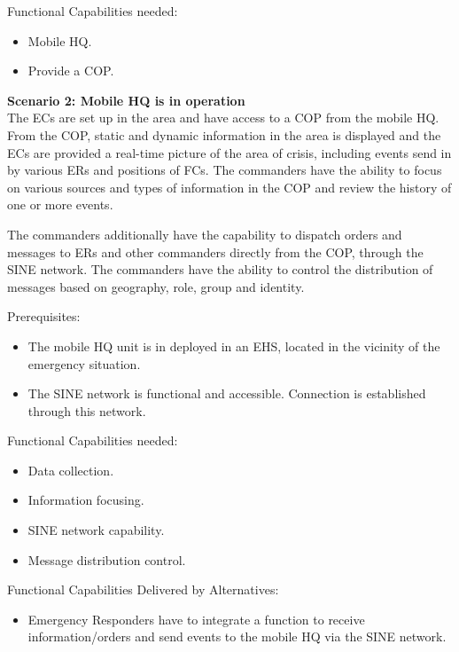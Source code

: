 \noindent Functional Capabilities needed:
\begin{itemize}
	\itemsep0em
	\item Mobile HQ.
	\item Provide a COP.
\end{itemize}

\vspace{20pt}
\noindent \textbf{Scenario 2: Mobile HQ is in operation} \\
The ECs are set up in the area and have access to a COP from the mobile HQ.
From the COP, static and dynamic information in the area is displayed and the ECs are provided a real-time picture of the area of crisis, including events send in by various ERs and positions of FCs.
The commanders have the ability to focus on various sources and types of information in the COP and review the history of one or more events. 

The commanders additionally have the capability to dispatch orders and messages to ERs and other commanders directly from the COP, through the SINE network. The commanders have the ability to control the distribution of messages based on geography, role, group and identity.

\noindent Prerequisites:
\begin{itemize}
	\itemsep0em
	\item The mobile HQ unit is in deployed in an EHS, located in the vicinity of the emergency situation.
	\item The SINE network is functional and accessible. Connection is established through this network.
\end{itemize}

\newpage
\noindent Functional Capabilities needed:
\begin{itemize}
	\itemsep0em
	\item Data collection.
	\item Information focusing.
	\item SINE network capability.
	\item Message distribution control.
\end{itemize}

\noindent Functional Capabilities Delivered by Alternatives:
\begin{itemize}
	\item Emergency Responders have to integrate a function to receive information/orders and send events to the mobile HQ via the SINE network.
\end{itemize} 

